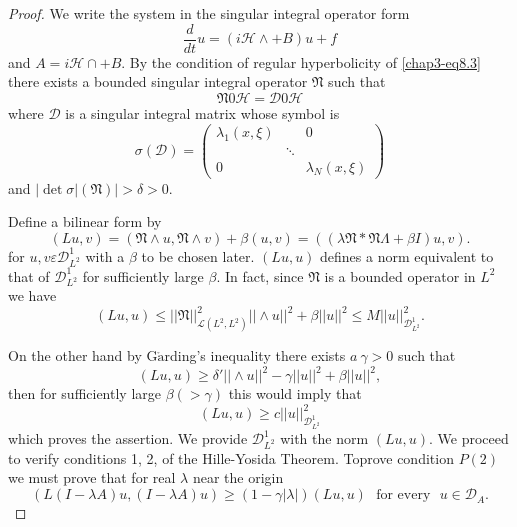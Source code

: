 \begin{proof}
We write the system in the singular integral operator form 
\begin{equation*}
\frac{d}{dt} u = ( i \mathscr{H} \wedge + B) u + f
\tag{8.6}\label{chap3-eq8.6} 
\end{equation*}
and $A = i \mathscr{H} \cap + B$. By the condition of regular
hyperbolicity of \eqref{chap3-eq8.3} there exists a bounded singular integral
operator $\mathfrak{N}$ such that  
$$
\mathfrak{N} 0  \mathscr{H} =  \mathscr{D} 0  \mathscr{H}
$$\pageoriginale
where $\mathscr{D}$ is a singular integral matrix whose symbol is  
$$
\sigma (\mathscr{D}) = 
\begin{pmatrix}
\lambda_1 (x, \xi) & & 0\\
&  \ddots & \\
0 & & \lambda_N (x, \xi)
\end{pmatrix}
$$
and $|\det \sigma |(\mathfrak{N}) | > \delta > 0$.

Define a bilinear form by 
\begin{equation*}
(Lu, v) = (\mathfrak{N} \wedge u, \mathfrak{N} \wedge v) + \beta (u,
  v) = (( \lambda \mathfrak{N}* \mathfrak{N}\Lambda + \beta I)u,
  v). \tag{8.7} \label{chap3-eq8.7}
\end{equation*}
for $u, v \varepsilon \mathscr{D}^1_{L^2}$ with a $\beta$ to be
chosen later. $(Lu, u)$ defines a norm equivalent to that of
$\mathscr{D}^1_{L^2}$ for sufficiently large $\beta$. In fact, since
$\mathfrak{N}$ is a bounded operator in $L^2$ we have  
$$
(Lu, u) \leq ||\mathfrak{N}||^2_{\mathscr{L}(L^2, L^2)} || \wedge u 
||^2 + \beta || u ||^2 \leq M || u ||^2_{\mathscr{D}^1_{L^2}}. 
$$

On the other hand by G$\ring{\text{a}}$rding's inequality there exists
$a\ \gamma > 0$ such that  
$$
(Lu, u) \geq \delta' || \wedge u ||^2 - \gamma || u ||^2 + \beta || u
||^2, 
$$
then for sufficiently large $\beta( > \gamma)$ this would imply that  
$$
(Lu, u)\geq c ||u||^2_{\mathscr{D}^1_{L^2}} 
$$
which proves the assertion. We provide $\mathscr{D}^1_{L^2}$ with the
norm $(Lu, u)$. We proceed to verify conditions 1, 2, of the
Hille-Yosida Theorem. 
To\pageoriginale prove condition $P(2)$ we must prove that for real
$\lambda$ near the origin  
\begin{equation*}
(L(I- \lambda A) u, (I- \lambda A)u) \geq (1 - \gamma| \lambda|) (Lu,
  u) \text{~ for every~ } u \in
  \mathscr{D}_A. \tag{8.8} \label{chap3-eq8.8} 
\end{equation*}


\end{proof}
